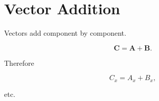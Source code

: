 \section{Vector Addition}

Vectors add component by component.

\[
\mathbf C
=
\mathbf A+\mathbf B.
\]

Therefore

\[
C_x=A_x+B_x,
\]

etc.

